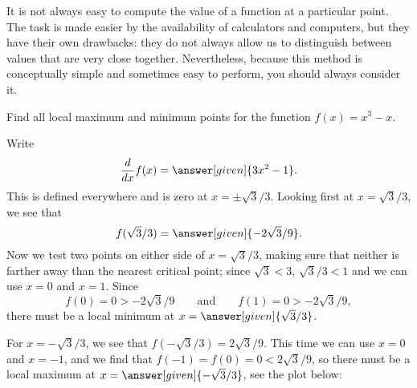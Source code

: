 \documentclass{ximera}
\begin{document}
It is not always easy to compute the value of a function at a
particular point. The task is made easier by the availability of
calculators and computers, but they have their own drawbacks: they do
not always allow us to distinguish between values that are very close
together. Nevertheless, because this method is conceptually simple and
sometimes easy to perform, you should always consider it.




\begin{example}
Find all local maximum and minimum points for the function 
$f(x)=x^3-x$. 
\begin{explanation} 
Write
\[
\ddx f(x)=\answer[given]{3x^2-1}.
\] 
This is defined everywhere and is zero at $x=\pm \sqrt{3}/3$. Looking
first at $x=\sqrt{3}/3$, we see that 
\[
f(\sqrt{3}/3)=\answer[given]{-2\sqrt{3}/9}.
\] 
Now we test two points on either side of $x=\sqrt{3}/3$, making sure
that neither is farther away than the nearest critical point; since
$\sqrt{3}<3$, $\sqrt{3}/3<1$ and we can use $x=0$ and $x=1$. Since
\[
f(0)=0>-2\sqrt{3}/9\qquad\text{and}\qquad f(1)=0>-2\sqrt{3}/9,
\] 
there must be a local minimum at $x=\answer[given]{\sqrt{3}/3}$.

For $x=-\sqrt{3}/3$, we see that $f(-\sqrt{3}/3)=2\sqrt{3}/9$. This
time we can use $x=0$ and $x=-1$, and we find that $f(-1)=f(0)=0<
2\sqrt{3}/9$, so there must be a local maximum at
$x=\answer[given]{-\sqrt{3}/3}$, see the plot below:
\begin{image}
\end{image}
\end{explanation}
\end{example}
\end{document}
